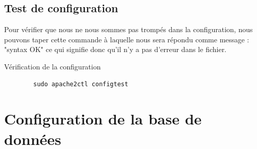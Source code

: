 \documentclass[12pt, a4paper]{article}
\begin{document}
    \subsection{Test de configuration}
    Pour vérifier que nous ne nous sommes pas trompés dans la configuration,
    nous pouvons taper cette commande à laquelle nous sera répondu comme message :
    "syntax OK" ce qui signifie donc qu'il n'y a pas d'erreur dans le fichier.
    \begin{listing}[H]
        \caption{Vérification de la configuration}
        \label{lst:verif}
        \begin{verbatim}
        sudo apache2ctl configtest 
        \end{verbatim}
    \end{listing}
\newpage
\section{Configuration de la base de données}
\end{document}
